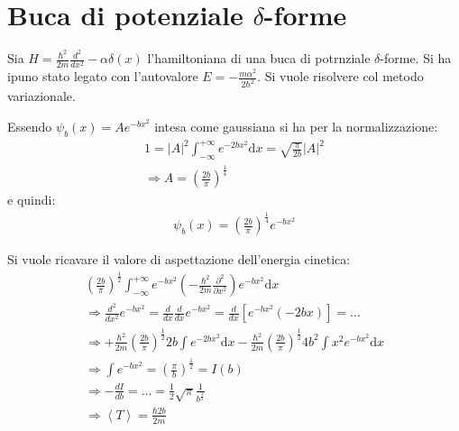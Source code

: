 \section{Buca di potenziale $\delta$-forme} %
Sia $H=\frac{\hbar ^2}{2m}\frac{d^2}{dx^2}-\alpha\delta\left(x\right)$ l'hamiltoniana di una buca di potrnziale $\delta$-forme. Si ha ipuno stato legato con l'autovalore $E=-\frac{m\alpha^2}{2\hbar ^2}$. Si vuole risolvere col metodo variazionale.

Essendo $\psi _b\left(x\right)=Ae^{-bx^2}$ intesa come gaussiana si ha per la normalizzazione:
\begin{equation}\begin{split}
1=|A|^2\int_{-\infty }^{+\infty }{e^{-2bx^2}\textrm{d}x}=\sqrt{\frac{\pi}{2b}}|A|^2\\
\Longrightarrow A=\left(\frac{2b}{\pi}\right)^{\frac{1}{4}}
\end{split}\end{equation}
e quindi:
\begin{equation}\begin{split}
\psi _b\left(x\right)=\left(\frac{2b}{\pi}\right)^{\frac{1}{4}}e^{-bx^2}
\end{split}\end{equation}

Si vuole ricavare il valore di aspettazione dell'energia cinetica:
\begin{equation}\begin{split}
\left(\frac{2b}{\pi}\right)^{\frac{1}{2}}\int_{-\infty }^{+\infty }{e^{-bx^2}\left(-\frac{\hbar ^2}{2m}\frac{\partial ^2}{\partial x^2}\right)e^{-bx^2}\textrm{d}x}\\
\Longrightarrow \frac{d^2}{dx^2}e^{-bx^2}=\frac{d}{dx}\frac{d}{dx}e^{-bx^2}=\frac{d}{dx}\left[e^{-bx^2}\left(-2bx\right)\right]=\dots\\
\Longrightarrow +\frac{\hbar ^2}{2m}\left(\frac{2b}{\pi}\right)^{\frac{1}{2}}2b\int{e^{-2bx^2}\textrm{d}x}-\frac{\hbar ^2}{2m}\left(\frac{2b}{\pi}\right)^{\frac{1}{2}}4b^2\int{x^2e^{-bx^2}\textrm{d}x}\\
\Longrightarrow \int{e^{-bx^2}}=\left(\frac{\pi}{b}\right)^{\frac{1}{2}}=I\left(b\right)\\
\Longrightarrow -\frac{dI}{db}=\dots=\frac{1}{2}\sqrt{\pi}\frac{1}{b^{\frac{3}{2}}}\\
\Longrightarrow \left\langle T \right\rangle=\frac{\hbar 2b}{2m}
\end{split}\end{equation}

